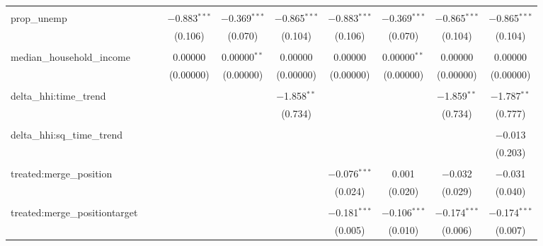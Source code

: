 \begin{table}[H]
{\begin{tabular}{@{\extracolsep{5pt}}lccccccccc}
   & & & & & & & & & \\  

  prop\_unemp &  &  & $-$0.883$^{***}$ & $-$0.369$^{***}$ & $-$0.865$^{***}$ & $-$0.883$^{***}$ & $-$0.369$^{***}$ & $-$0.865$^{***}$ & $-$0.865$^{***}$ \\  

   &  &  & (0.106) & (0.070) & (0.104) & (0.106) & (0.070) & (0.104) & (0.104) \\  

   & & & & & & & & & \\  

  median\_household\_income &  &  & 0.00000 & 0.00000$^{**}$ & 0.00000 & 0.00000 & 0.00000$^{**}$ & 0.00000 & 0.00000 \\  

   &  &  & (0.00000) & (0.00000) & (0.00000) & (0.00000) & (0.00000) & (0.00000) & (0.00000) \\  

   & & & & & & & & & \\  

  delta\_hhi:time\_trend &  &  &  &  & $-$1.858$^{**}$ &  &  & $-$1.859$^{**}$ & $-$1.787$^{**}$ \\  

   &  &  &  &  & (0.734) &  &  & (0.734) & (0.777) \\  

   & & & & & & & & & \\  

  delta\_hhi:sq\_time\_trend &  &  &  &  &  &  &  &  & $-$0.013 \\  

   &  &  &  &  &  &  &  &  & (0.203) \\  

   & & & & & & & & & \\  

  treated:merge\_position &  &  &  &  &  & $-$0.076$^{***}$ & 0.001 & $-$0.032 & $-$0.031 \\  

   &  &  &  &  &  & (0.024) & (0.020) & (0.029) & (0.040) \\  

   & & & & & & & & & \\  

  treated:merge\_positiontarget &  &  &  &  &  & $-$0.181$^{***}$ & $-$0.106$^{***}$ & $-$0.174$^{***}$ & $-$0.174$^{***}$ \\  

   &  &  &  &  &  & (0.005) & (0.010) & (0.006) & (0.007) \\  


\end{tabular}}
\end{table}
